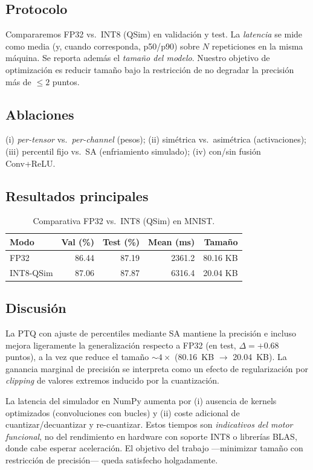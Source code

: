 \subsection*{Protocolo}
Compararemos FP32 vs.\ INT8 (QSim) en validación y test. La \emph{latencia} se mide como media (y, cuando corresponda, p50/p90) sobre $N$ repeticiones en la misma máquina. Se reporta además el \emph{tamaño del modelo}. Nuestro objetivo de optimización es reducir tamaño bajo la restricción de no degradar la precisión más de $\leq 2$ puntos.

\subsection*{Ablaciones}
(i) \emph{per-tensor} vs.\ \emph{per-channel} (pesos); (ii) simétrica vs.\ asimétrica (activaciones); (iii) percentil fijo vs.\ SA (enfriamiento simulado); (iv) con/sin fusión Conv+ReLU.

\subsection*{Resultados principales}

\begin{table}[h]
\centering
\caption{Comparativa FP32 vs.\ INT8 (QSim) en MNIST.}
\begin{tabular}{lrrrr}
\toprule
Modo & Val (\%) & Test (\%) & Mean (ms) & Tamaño \\
\midrule
FP32      & 86.44 & 87.19 & 2361.2 & 80.16 KB \\
INT8-QSim & 87.06 & 87.87 & 6316.4 & 20.04 KB \\
\bottomrule
\end{tabular}
\end{table}

\subsection*{Discusión}
La PTQ con ajuste de percentiles mediante SA mantiene la precisión e incluso mejora ligeramente la generalización respecto a FP32 (en test, $\Delta=+0.68$ puntos), a la vez que reduce el tamaño $\sim 4\times$ (80.16~KB $\rightarrow$ 20.04~KB). La ganancia marginal de precisión se interpreta como un efecto de regularización por \emph{clipping} de valores extremos inducido por la cuantización.

La latencia del simulador en NumPy aumenta por (i) ausencia de kernels optimizados (convoluciones con bucles) y (ii) coste adicional de cuantizar/decuantizar y re-cuantizar. Estos tiempos son \emph{indicativos del motor funcional}, no del rendimiento en hardware con soporte INT8 o librerías BLAS, donde cabe esperar aceleración. El objetivo del trabajo —minimizar tamaño con restricción de precisión— queda satisfecho holgadamente.

